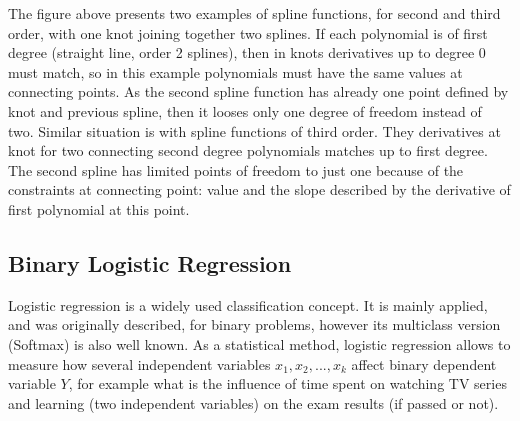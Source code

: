 \documentclass[energies,article,submit,pdftex,moreauthors]{Definitions/mdpi}
\begin{document}
The figure above presents two examples of spline functions, for second and third order, with one knot joining together two splines. If each polynomial is of first degree (straight line, order 2 splines), then in knots derivatives up to degree 0 must match, so in this example polynomials must have the same values at connecting points. As the second spline function has already one point defined by knot and previous spline, then it looses only one degree of freedom instead of two. Similar situation is with spline functions of third order. They derivatives at knot for two connecting second degree polynomials matches up to first degree. The second spline has limited points of freedom to just one because of the constraints at connecting point: value and the slope described by the derivative of first polynomial at this point.

\subsection{Binary Logistic Regression}
Logistic regression is a widely used classification concept. It is mainly applied, and was originally described, for binary problems, however its multiclass version (Softmax) is also well known. As a statistical method, logistic regression allows to measure how several independent variables $ x_1, x_2, ...,  x_k $ affect binary dependent variable $Y$, for example what is the influence of time spent on watching TV series and learning (two independent variables) on the exam results (if passed or not). 
\end{document}
